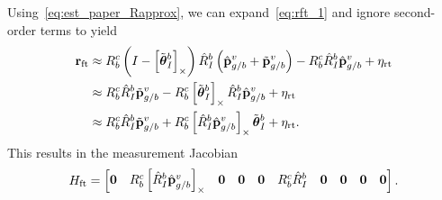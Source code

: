 Using~\eqref{eq:est_paper_Rapprox}, we can expand~\eqref{eq:rft_1} and ignore
second-order terms to yield
\begin{align}
   \boldsymbol{\mathrm{r}}_{\text{ft}} &\approx R_b^c \left( I - \left[ \tilde{\boldsymbol{\mathrm{\theta}}}_I^b  \right]_{\times}\right) \hat{R}_I^b \left( \hat{\boldsymbol{\mathrm{p}}}_{g/b}^v + \tilde{\boldsymbol{\mathrm{p}}}_{g/b}^v \right) 
                          - R_b^c \hat{R}_I^b \hat{\boldsymbol{\mathrm{p}}}_{g/b}^v +
                          \eta_{\text{rt}} \\
  &\approx R_b^c \hat{R}_I^b \tilde{\boldsymbol{\mathrm{p}}}_{g/b}^v -
  R_b^c \left[ \tilde{\boldsymbol{\mathrm{\theta}}}_I^b  \right]_{\times} \hat{R}_I^b \hat{\boldsymbol{\mathrm{p}}}_{g/b}^v 
      + \eta_{\text{rt}} \\
&\approx R_b^c \hat{R}_I^b \tilde{\boldsymbol{\mathrm{p}}}_{g/b}^v + R_b^c \left[ \hat{R}_I^b \hat{\boldsymbol{\mathrm{p}}}_{g/b}^v \right]_{\times} \tilde{\boldsymbol{\mathrm{\theta}}}_I^b 
      + \eta_{\text{rt}}.
\end{align}
This results in the measurement Jacobian
\begin{equation}
  H_{\text{ft}} =
  \begin{bmatrix}
    \boldsymbol{\mathrm{0}} & R_b^c \left[  \hat{R}_I^b \hat{\boldsymbol{\mathrm{p}}}_{g/b}^v  \right]_{\times} & \boldsymbol{\mathrm{0}} &
    \boldsymbol{\mathrm{0}} & \boldsymbol{\mathrm{0}} & R_b^c \hat{R}_I^b & \boldsymbol{\mathrm{0}} & \boldsymbol{\mathrm{0}} & \boldsymbol{\mathrm{0}} & \boldsymbol{\mathrm{0}}
  \end{bmatrix}.
\end{equation}




